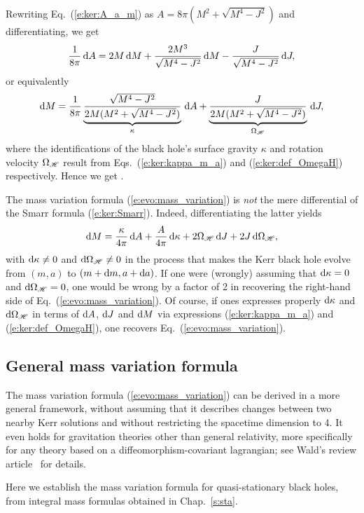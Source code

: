 Rewriting Eq.~(\ref{e:ker:A_a_m}) as $A = 8 \pi (M^2 + \sqrt{M^4 - J^2})$
and differentiating, we get
\[
\frac{1}{8\pi} \, \mathrm{d} A =  2 M\,  \mathrm{d} M + \frac{2M^3}{\sqrt{M^4-J^2}}\, \mathrm{d} M
    - \frac{J}{\sqrt{M^4-J^2}}\, \mathrm{d} J ,
\]
or equivalently
\[
    \mathrm{d} M = \frac{1}{8\pi}
\underbrace{\frac{\sqrt{M^4-J^2}}{2M(M^2+\sqrt{M^4-J^2})}}_{\kappa} \, \mathrm{d} A
+ \underbrace{\frac{J}{2M(M^2+\sqrt{M^4-J^2})}}_{\Omega_{\mathscr{H}}} \, \mathrm{d} J  ,
\]
where the identifications of the black hole's surface gravity $\kappa$ and
rotation velocity $\Omega_{\mathscr{H}}$ result from Eqs.~(\ref{e:ker:kappa_m_a})
and (\ref{e:ker:def_OmegaH}) respectively. Hence we get
\be \label{e:evo:mass_variation}
     .
\ee
\begin{remark}
The mass variation formula (\ref{e:evo:mass_variation}) is \emph{not}
the mere differential of the Smarr formula (\ref{e:ker:Smarr}). Indeed, differentiating
the latter yields
\[
    \mathrm{d} M = \frac{\kappa}{4\pi} \, \mathrm{d} A +  \frac{A}{4\pi} \, \mathrm{d} \kappa
        + 2 \Omega_{\mathscr{H}} \, \mathrm{d} J  + 2 J \, \mathrm{d}\Omega_{\mathscr{H}} ,
\]
with $\mathrm{d}\kappa \neq 0$ and $\mathrm{d}\Omega_{\mathscr{H}}\neq 0$ in the process
that makes the Kerr black hole evolve from $(m,a)$ to $(m+\mathrm{d} m, a+\mathrm{d} a)$.
If one were (wrongly) assuming that $\mathrm{d}\kappa = 0$ and $\mathrm{d}\Omega_{\mathscr{H}} = 0$, one would
be wrong by a factor of 2 in recovering the right-hand side of
Eq.~(\ref{e:evo:mass_variation}). Of course, if ones
expresses properly $\mathrm{d}\kappa$ and $\mathrm{d}\Omega_{\mathscr{H}}$ in terms of
$\mathrm{d} A$, $\mathrm{d} J$ and $\mathrm{d} M$ via expressions (\ref{e:ker:kappa_m_a})
and (\ref{e:ker:def_OmegaH}), one recovers Eq.~(\ref{e:evo:mass_variation}).
\end{remark}

\subsection{General mass variation formula} \label{s:evo:gen_mass_variation}

The mass variation formula (\ref{e:evo:mass_variation}) can be derived in
a more general framework, without assuming that it describes changes between
two nearby Kerr solutions \cite{BardeCH73,Carte79} and without restricting
the spacetime dimension to 4. It even holds
for gravitation theories other than general relativity, more specifically
for any theory based on a diffeomorphism-covariant lagrangian; see Wald's review
article~\cite{Wald01} for details.

Here we establish the mass variation formula for quasi-stationary black holes,
from integral mass formulas obtained in Chap.~\ref{s:sta}.

